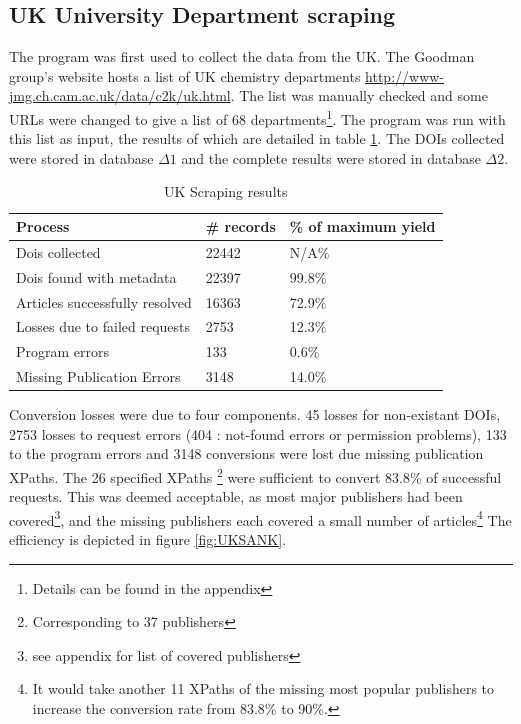 \subsection{UK University Department scraping}
\label{sec:UKSCRAPE}
The program was first used to collect the data from the UK. The Goodman group's website hosts a list of UK chemistry departments \url{http://www-jmg.ch.cam.ac.uk/data/c2k/uk.html}. The list was manually checked and some URLs were changed to give a list of 68 departments\footnote{Details can be found in the appendix}. The program was run with this list as input, the results of which are detailed in table \ref{tab:UKSCRAPERES}. The DOIs collected were stored in database $\Delta1$ and the complete results were stored in database $\Delta2$.
\begin{table}[h!]
\caption{UK Scraping results}
\label{tab:UKSCRAPERES}

\begin{center}
\begin{tabular}{||l|l|l||}
\hline
Process & \# records & \% of maximum yield\\
\hline
Dois collected & 22442 & N/A\%\\
Dois found with metadata & 22397 & 99.8\%\\
Articles successfully resolved & 16363 & 72.9\%\\
Losses due to failed requests & 2753 & 12.3\%\\
Program errors & 133 & 0.6\%\\
Missing Publication Errors & 3148 & 14.0\% \\
\hline
\end{tabular}
\end{center}
\end{table}
Conversion losses were due to four components. 45 losses for non-existant DOIs, 2753 losses to request errors (404 : not-found errors or permission problems), 133 to the program errors and 3148 conversions were lost due missing publication XPaths. The 26 specified XPaths \footnote{Corresponding to 37 publishers} were sufficient to convert 83.8\% of successful requests. This was deemed acceptable, as most major publishers had been covered\footnote{see appendix for list of covered publishers}, and the missing publishers each covered a small number of articles\footnote{It would take another 11 XPaths of the missing most popular publishers to increase the conversion rate from 83.8\% to 90\%.}
The efficiency is depicted in figure \ref{fig:UKSANK}.

